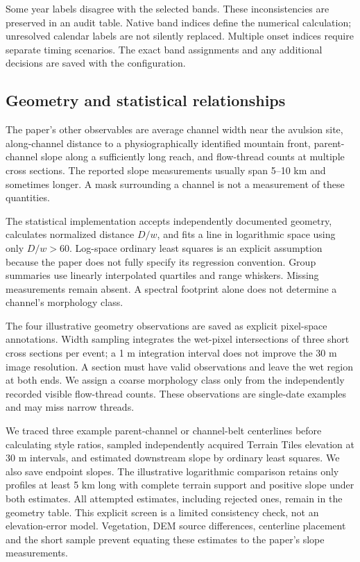 \documentclass[11pt]{article}
\begin{document}
Some year labels disagree with the selected bands. These inconsistencies
are preserved in an audit table. Native band indices define the numerical
calculation; unresolved calendar labels are not silently replaced. Multiple
onset indices require separate timing scenarios. The exact band assignments
and any additional decisions are saved with the configuration.


\subsection{Geometry and statistical relationships}
The paper's other observables are average channel width near the avulsion
site, along-channel distance to a physiographically identified mountain
front, parent-channel slope along a sufficiently long reach, and flow-thread
counts at multiple cross sections. The reported slope measurements usually
span 5--10 km and sometimes longer. A mask surrounding a channel is not a
measurement of these quantities.

The statistical implementation accepts independently documented geometry,
calculates normalized distance $D/w$, and fits a line in logarithmic space
using only $D/w>60$. Log-space ordinary least squares is an explicit
assumption because the paper does not fully specify its regression
convention. Group summaries use linearly interpolated quartiles and range
whiskers. Missing measurements remain absent. A spectral footprint alone
does not determine a channel's morphology class.

The four illustrative geometry observations are saved as explicit pixel-space
annotations. Width sampling integrates the wet-pixel intersections of three
short cross sections per event; a 1 m integration interval does not improve
the 30 m image resolution. A section must have valid observations and leave
the wet region at both ends. We assign a coarse morphology class only from
the independently recorded visible flow-thread counts. These observations
are single-date examples and may miss narrow threads.

We traced three example parent-channel or channel-belt centerlines before
calculating style ratios, sampled independently acquired Terrain Tiles
elevation at 30 m intervals, and estimated downstream slope by ordinary
least squares. We also save endpoint slopes. The illustrative logarithmic
comparison retains only profiles at least 5 km long with complete terrain
support and positive slope under both estimates. All attempted estimates,
including rejected ones, remain in the geometry table. This explicit
screen is a limited consistency check, not an elevation-error model.
Vegetation, DEM source differences, centerline placement and the short
sample prevent equating these estimates to the paper's slope measurements.
\end{document}
